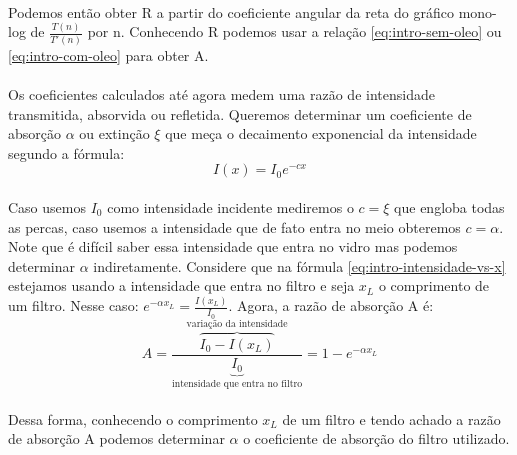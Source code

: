 \documentclass[a4paper,11pt]{article}
\begin{document}
\paragraph{}Podemos então obter R a partir do coeficiente angular da reta do gráfico mono-log de $\frac{T(n)}{T'(n)}$ por n. Conhecendo R podemos usar a relação \ref{eq:intro-sem-oleo} ou \ref{eq:intro-com-oleo} para obter A.

\paragraph{}Os coeficientes calculados até agora medem uma razão de intensidade transmitida, absorvida ou refletida. Queremos determinar um coeficiente de absorção $\alpha$ ou extinção $\xi$ que meça o decaimento exponencial da intensidade segundo a fórmula:
\begin{equation}
	I(x) = I_0 e^{- c x}
	\label{eq:intro-intensidade-vs-x}
\end{equation}

\paragraph{}Caso usemos $I_0$ como intensidade incidente mediremos o $c = \xi$ que engloba todas as percas, caso usemos a intensidade que de fato entra no meio obteremos $c = \alpha$. Note que é difícil saber essa intensidade que entra no vidro mas podemos determinar $\alpha$ indiretamente. Considere que na fórmula \ref{eq:intro-intensidade-vs-x} estejamos usando a intensidade que entra no filtro e seja $x_L$ o comprimento de um filtro. Nesse caso:
 $e^{-\alpha x_L} = \frac{I(x_L)}{I_0}$. Agora, a razão de absorção A é:
  \begin{equation}
     A = \frac{\overbrace{I_0 - I(x_L)}^\textrm{variação da intensidade}}{\underbrace{I_0}_\textrm{intensidade que entra no filtro}} = 1 - e^{-\alpha x_L}
	\label{eq:intro-achando-alpha}	
	\end{equation}
\paragraph{}Dessa forma, conhecendo o comprimento $x_L$ de um filtro e tendo achado a razão de absorção A podemos determinar $\alpha$ o coeficiente de absorção do filtro utilizado.
\end{document}
